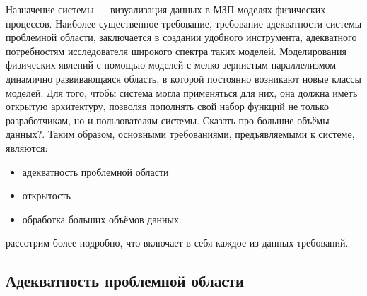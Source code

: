 \documentclass[a4paper,12pt]{extarticle}
\begin{document}
Назначение системы — визуализация данных в МЗП моделях физических процессов.  Наиболее существенное требование, требование адекватности системы проблемной области, заключается в создании удобного инструмента, адекватного потребностям исследователя широкого спектра таких моделей.  Моделирования физических явлений с помощью моделей с мелко-зернистым параллелизмом — динамично развивающаяся область, в которой постоянно возникают новые классы моделей. Для того, чтобы система могла применяться для них, она должна иметь открытую архитектуру, позволяя пополнять свой набор функций не только разработчикам, но и пользователям системы. Сказать про большие объёмы данных?. Таким образом, основными требованиями, предъявляемыми к системе, являются:
\begin{itemize}
    \item адекватность проблемной области
    \item открытость
    \item обработка больших объёмов данных
\end{itemize}

рассотрим более подробно, что включает в себя каждое из данных требований.

\subsection{Адекватность проблемной области}
\label{sec:requirements-adequacy}
\end{document}
